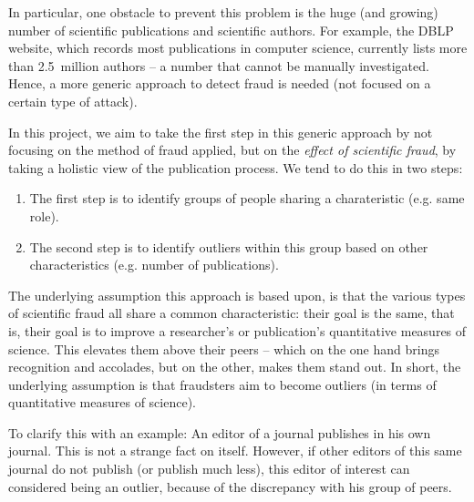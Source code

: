 \documentclass{ou-report}
\newcommand{\todo}[1]{{\color{red} TODO: #1}}
\begin{document}
In particular, one obstacle to prevent this problem is the huge (and growing) 
number of scientific 
publications and scientific authors. For example, the DBLP website, which 
records most publications in computer science, currently lists more than 
2.5~million authors -- a number that cannot be manually investigated. Hence, a 
more generic approach to detect fraud is needed (not focused on a certain type
of attack).


In this project, we aim to take the first step in this generic approach by not 
focusing on the method of fraud applied, but on the 
\emph{effect of scientific fraud}, by
taking a holistic view of the publication process. We tend to do this in two 
steps:
\begin{enumerate}
    \item The first step is to identify groups of people sharing a 
        charateristic (e.g. same role).
    \item The second step is to identify outliers within this group based on
        other characteristics (e.g. number of publications).
\end{enumerate}

The underlying assumption this approach is based upon, is that the various types 
of scientific fraud all 
share a common characteristic: their goal is the same, that is, their goal 
is to improve a researcher's or publication's quantitative measures of 
science. This elevates them above their peers -- which on the one hand 
brings recognition and accolades, but on the other, makes them stand out. In 
short, the underlying assumption is that fraudsters aim to become outliers 
(in terms of quantitative measures of science).

To clarify this with an example: An editor of a journal publishes in his 
own journal. This is not a strange fact on itself. However, if other editors of
this same journal do not publish (or publish much less), this editor of interest
can considered being an outlier, because of the discrepancy with his group 
of peers. 
\end{document}
